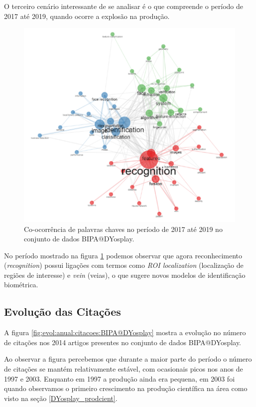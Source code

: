 O terceiro cenário interessante de se analisar é o que compreende o período de 2017 até 2019, quando ocorre a explosão na produção.

\begin{figure}[H]
    \centering
    \includegraphics[width=1\textwidth]{experiments/DYosplay/PesquisaBibliometrica/Imagens/BIPA@DYosplay_CoOcurrenceNetwork2017-2019.png}
    \caption{Co-ocorrência de palavras chaves no período de 2017 até 2019 no conjunto de dados BIPA@DYosplay.}
    \label{fig:CoOcurrence2017-2019:BIPA@DYosplay}
\end{figure}

No período mostrado na figura \ref{fig:CoOcurrence2017-2019:BIPA@DYosplay} podemos observar que agora reconhecimento (\textit{recognition}) possui ligações com termos como \textit{ROI localization} (localização de regiões de interesse) e \textit{vein} (veias), o que sugere novos modelos de identificação biométrica.

\subsection{Evolução das Citações}

A figura \ref{fig:evol:anual:citacoes:BIPA@DYosplay} mostra a evolução no número de citações nos 2014 artigos presentes no conjunto de dados BIPA@DYosplay. 

Ao observar a figura percebemos que durante a maior parte do período o número de citações se mantém relativamente estável, com ocasionais picos nos anos de 1997 e 2003. Enquanto em 1997 a produção ainda era pequena, em 2003 foi quando observamos o primeiro crescimento na produção científica na área como visto na seção \ref{DYosplay_prodcient}. 

